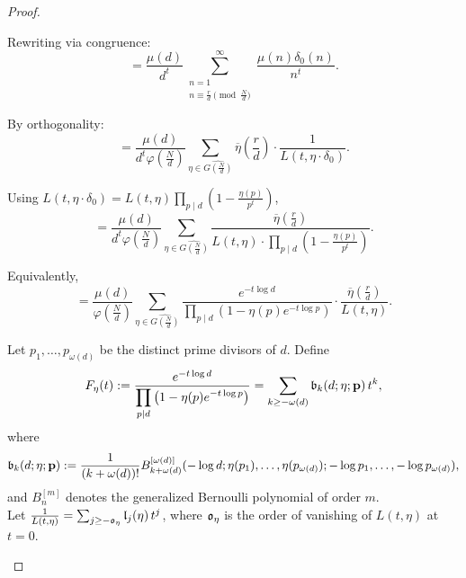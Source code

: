 \documentclass[12pt]{amsart}
\begin{document}
\begin{proof}
\begin{enumerate}[label= \roman*)]
Rewriting via congruence:
\begin{equation*}
= \frac{\mu(d)}{d^t} \sum_{\substack{n=1 \\ n \equiv \frac{r}{d}\pmod{\frac{N}{d}}}}^\infty \frac{\mu(n) \delta_0(n)}{n^t}.
\end{equation*}


By orthogonality:
\begin{equation*}
= \frac{\mu(d)}{d^t \varphi\left( \frac{N}{d} \right)} \sum_{\eta \in \widehat{G\left( \frac{N}{d} \right)}} \overline{\eta}\left( \frac{r}{d} \right) \cdot \frac{1}{L(t, \eta \cdot \delta_0)}.
\end{equation*}


Using $L(t, \eta \cdot \delta_0) = L(t, \eta) \prod_{p \mid d} \left( 1 - \frac{\eta(p)}{p^t} \right)$,
\begin{equation*}
= \frac{\mu(d)}{d^t \varphi\left( \frac{N}{d} \right)} \sum_{\eta \in \widehat{G\left( \frac{N}{d} \right)}} \frac{ \overline{\eta}\left( \frac{r}{d} \right) }{ L(t, \eta) \cdot \displaystyle\prod_{p \mid d} \left( 1 - \frac{\eta(p)}{p^t} \right) }.
\end{equation*}


Equivalently,
\begin{equation*}
= \frac{\mu(d)}{\varphi\left( \frac{N}{d} \right)} \sum_{\eta \in \widehat{G\left( \frac{N}{d} \right)}} \frac{ e^{-t \log d} }{ \displaystyle\prod_{p \mid d} \left( 1 - \eta(p) e^{-t \log p} \right) } \cdot \frac{ \overline{\eta}\left( \frac{r}{d} \right) }{ L(t, \eta) }.
\end{equation*}


Let $p_1, \dots, p_{\omega(d)}$ be the distinct prime divisors of $d$. Define
\begin{equation*}
F_\eta(t) := \frac{ e^{-t \log d} }{ \displaystyle\prod_{p \mid d} \left( 1 - \eta(p) e^{-t \log p} \right) } = \sum_{k \geq -\omega(d)} \frak{b}_k(d; \eta; \mathbf{p}) \, t^k,
\end{equation*}
where
\begin{equation*}
\frak{b}_k(d; \eta; \mathbf{p}) := \frac{1}{(k + \omega(d))!} 
B_{k+\omega(d)}^{[\omega(d)]}(-\log d; \eta(p_1), \dots, \eta(p_{\omega(d)}); -\log p_1, \dots, -\log p_{\omega(d)}),
\end{equation*}
and $B_n^{[m]}$ denotes the generalized Bernoulli polynomial of order $m$.\\


Let $\frac{1}{L(t, \eta)} = \sum_{j \geq -\frak{o}_\eta} \frak{l}_j(\eta) \, t^j$, where $\frak{o}_\eta$ is the order of vanishing of $L(t,\eta)$ at $t=0$.



\end{enumerate}
\end{proof}
\end{document}

